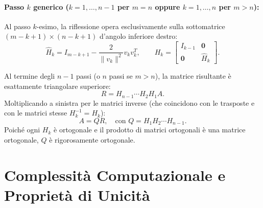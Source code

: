 \paragraph{Passo $k$ generico ($k = 1, \dots, n-1$ per $m = n$ oppure $k = 1, \dots, n$ per $m > n$):}
Al passo $k$-esimo, la riflessione opera esclusivamente sulla sottomatrice $(m - k + 1) \times (n - k + 1)$ d'angolo inferiore destro:
\begin{equation}
    \hat{H}_k = I_{m-k+1} - \frac{2}{\|v_k\|^2} v_k v_k^T, \qquad H_k = \begin{bmatrix} I_{k-1} & \mathbf{0} \\ \mathbf{0} & \hat{H}_k \end{bmatrix}.
\end{equation}

Al termine degli $n-1$ passi (o $n$ passi se $m > n$), la matrice risultante \`e esattamente triangolare superiore:
\begin{equation}
    R = H_{n-1} \cdots H_2 H_1 A.
\end{equation}
Moltiplicando a sinistra per le matrici inverse (che coincidono con le trasposte e con le matrici stesse $H_k^{-1} = H_k$):
\begin{equation}
    A = Q R, \quad \text{con } Q = H_1 H_2 \cdots H_{n-1}.
\end{equation}
Poich\'e ogni $H_k$ \`e ortogonale e il prodotto di matrici ortogonali \`e una matrice ortogonale, $Q$ \`e rigorosamente ortogonale.

\FloatBarrier
\section{Complessit\`a Computazionale e Propriet\`a di Unicit\`a}
\label{sec:complessita-unicita-qr}

